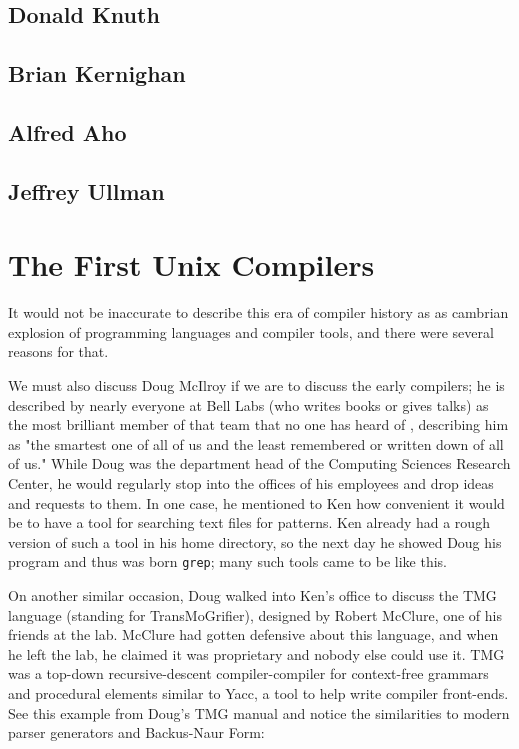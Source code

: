\subsection{Donald Knuth}
\subsection{Brian Kernighan}
\subsection{Alfred Aho}
\subsection{Jeffrey Ullman}

\section{The First Unix Compilers}

It would not be inaccurate to describe this era of compiler history
as as cambrian explosion of programming languages and compiler tools, and
there were several reasons for that.

We must also discuss Doug McIlroy if we are to discuss the early compilers;
he is described by nearly everyone at Bell Labs (who writes books or gives talks)
as the most brilliant member of that team that no one has heard of
\cite{kernighan_interviews_thompson_2019}, describing him as
"the smartest one of all of us and the least remembered or written down of all of us."
While Doug was the department head of the Computing Sciences Research Center,
he would regularly stop into the offices of his employees and drop ideas and requests
to them. In one case, he mentioned to Ken how convenient it would be to have
a tool for searching text files for patterns.
Ken already had a rough version of such a tool in his home directory,
so the next day he showed Doug his program and thus was born \texttt{grep};
many such tools came to be like this.

On another similar occasion, Doug walked into Ken's office to discuss the TMG language
(standing for TransMoGrifier),
designed by Robert McClure\cite{mcclure_tmg_compiler_compiler_1965}, one of his friends at the lab.
McClure had gotten defensive about this language, and when he left the lab,
he claimed it was proprietary and nobody else could use it.
TMG was a top-down recursive-descent compiler-compiler for context-free grammars
and procedural elements similar to Yacc, a tool to help write compiler
front-ends.
See this example from Doug's TMG manual\cite{tmg_manual_mcilroy_1972}
and notice the similarities to modern parser generators and Backus-Naur Form:

